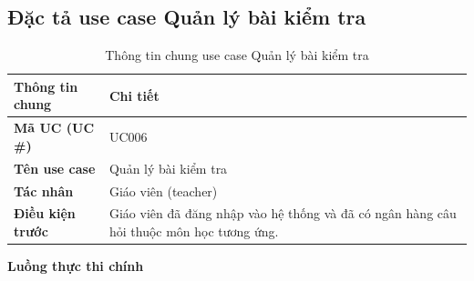 ﻿\documentclass[../DoAn.tex]{subfiles}
\begin{document}
\subsection{Đặc tả use case Quản lý bài kiểm tra}
\label{subsection:2.3.3}
\begin{table}[H]
\centering
\begin{tabular}{|p{4cm}|p{10cm}|}
\hline
\textbf{Thông tin chung} & \textbf{Chi tiết} \\ \hline
\textbf{Mã UC (UC \#)} & UC006 \\ \hline
\textbf{Tên use case} & Quản lý bài kiểm tra \\ \hline
\textbf{Tác nhân} & Giáo viên (teacher) \\ \hline
\textbf{Điều kiện trước} & Giáo viên đã đăng nhập vào hệ thống và đã có ngân hàng câu hỏi thuộc môn học tương ứng. \\ \hline
\end{tabular}
\caption{Thông tin chung use case Quản lý bài kiểm tra}
\label{table:2.3.3_info}
\end{table}
\noindent\textbf{Luồng thực thi chính}
\end{document}
